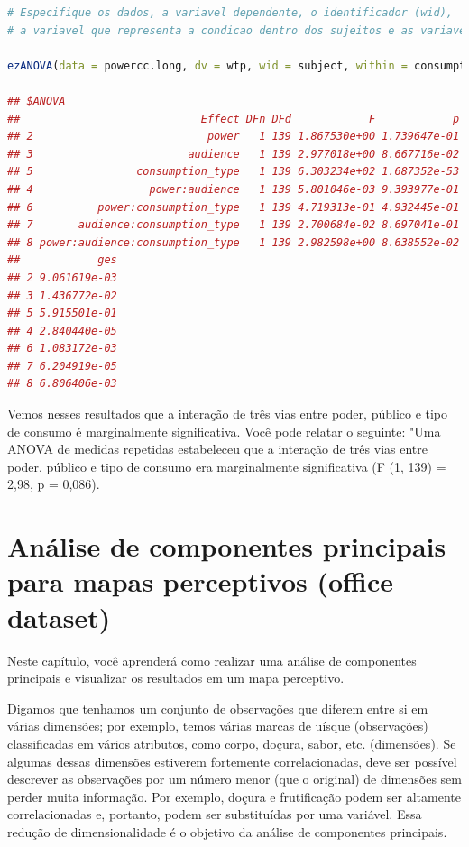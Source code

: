 \documentclass{article}
\begin{document}
\begin{lstlisting}[language=R]
# Especifique os dados, a variavel dependente, o identificador (wid),
# a variavel que representa a condicao dentro dos sujeitos e as variaveis que representam as condicoes entre os sujeitos.

ezANOVA(data = powercc.long, dv = wtp, wid = subject, within = consumption_type, between = power*audience)

## $ANOVA
##                            Effect DFn DFd            F            p p<.05
## 2                           power   1 139 1.867530e+00 1.739647e-01      
## 3                        audience   1 139 2.977018e+00 8.667716e-02      
## 5                consumption_type   1 139 6.303234e+02 1.687352e-53     *
## 4                  power:audience   1 139 5.801046e-03 9.393977e-01      
## 6          power:consumption_type   1 139 4.719313e-01 4.932445e-01      
## 7       audience:consumption_type   1 139 2.700684e-02 8.697041e-01      
## 8 power:audience:consumption_type   1 139 2.982598e+00 8.638552e-02      
##            ges
## 2 9.061619e-03
## 3 1.436772e-02
## 5 5.915501e-01
## 4 2.840440e-05
## 6 1.083172e-03
## 7 6.204919e-05
## 8 6.806406e-03

\end{lstlisting}

Vemos nesses resultados que a interação de três vias entre poder, público e tipo de consumo é marginalmente significativa. Você pode relatar o seguinte: "Uma ANOVA de medidas repetidas estabeleceu que a interação de três vias entre poder, público e tipo de consumo era marginalmente significativa (F (1, 139) = 2,98, p = 0,086).

\newpage
\section{Análise de componentes principais para mapas perceptivos (office dataset)}

Neste capítulo, você aprenderá como realizar uma análise de componentes principais e visualizar os resultados em um mapa perceptivo.

Digamos que tenhamos um conjunto de observações que diferem entre si em várias dimensões; por exemplo, temos várias marcas de uísque (observações) classificadas em vários atributos, como corpo, doçura, sabor, etc. (dimensões). Se algumas dessas dimensões estiverem fortemente correlacionadas, deve ser possível descrever as observações por um número menor (que o original) de dimensões sem perder muita informação. Por exemplo, doçura e frutificação podem ser altamente correlacionadas e, portanto, podem ser substituídas por uma variável. Essa redução de dimensionalidade é o objetivo da análise de componentes principais.
\end{document}
